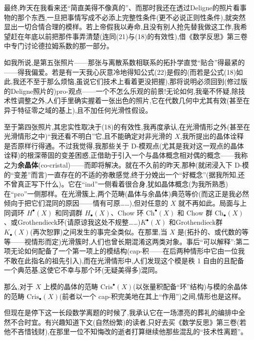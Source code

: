 \noindent 最终,昨天在我看来还“简直美得不像真的”、而那时我还在透过Deligne的照片看事物的那个东西,一旦把事情写成不必添上完整性条件(更不必说正则性条件),就突然显出一切合情合理的模样。若上帝假我以寿命,且没有别人抢先替我做这工作,我希望赶在年底以前把那件事弄清楚(连同(21)与(18)的有效性),借《数学反思》第三卷中专门讨论德拉姆系数的那一部分。

\noindent 如我所说,是第五张照片——那张与离散系数相联系的拓扑学直觉“贴合”得最紧的——得我偏爱。若是有一天我心灰意冷地得知公式(22)是假的(而若是公式(18)如此,我还不至于那么烦恼,虽说它们技术上看着更没把握),那将说明必须回到(修过版的Deligne照片的)pro-观点——一个不怎么乐观的前景!无论如何,我毫不怀疑,除技术性调整之外,人们手里确实握着一张出色的照片,它在代数几何中尤其有效(甚至在异于特征零之域的基上),且不加任何光滑性假设。

\noindent 至于第四张照片,其忠实性取决于(18)的有效性,我再度承认,在光滑情形之外(甚至在光滑情形之中)“我还看不明白”它,且不能确定对非光滑的 $X$,我所提出的晶体诠释是否原样行得通。不过我觉得,我那些关于 D-模观点(尤其是我对这一观点的晶体诠\dmark{}释)的根深蒂固的变差困惑,正借助于引入一个与晶体概念相对偶的概念——我称之为\textbf{余晶体}(co-cristal)——而即将解决。就在不久前的昨天,那种(就闭浸入下 D-模的“变差”而言)一直存在的不适的弥散感觉,终于分娩出一个“好概念”(据我所知,还不曾真正写下什么)。它在“ind”一侧看着很合身,犹如晶体概念(为我所熟悉)在“pro”一侧那样。在光滑簇上,两个范畴(晶体与余晶体)典范等价(而这正是我必然倾向于把它们混同的原因——情有可原……),但对任意的 $X$ 就不再如此。局面与上同调环 $H^{\bullet}(X)$ 和同调群 $H_{\bullet}(X)$、Chow 环 $\mathrm{Ch}^{\bullet}(X)$ 和 Chow 群 $\mathrm{Ch}_{\bullet}(X)$、或Grothendieck环(请原谅我这处不规整……)$K^{\bullet}(X)$ 和Grothendieck群 $K_{\bullet}(X)$(再次恕罪)之间发生的事完全类似。在那里,当 $X$ 是(拓扑的、或代数的等等——视情形而定)光滑簇时,人们也曾长期混淆这两类对象。事后“可以解释”:第二项无论如何配备了一个第一项上的模结构(cap-积——在后两种情形中它由一位我不敢在此指名的祖先引入),而在光滑情形中,人们发现这个模是秩 1 自由的且配备一个典范基,这使它不幸与那个环(无疑美得多)混同。

\noindent 那么,对于 $X$ 上模的晶体的范畴 $\mathrm{Cris}^{\bullet}(X)$(以张量积配备“环”结构)与模的余晶体的范畴 $\mathrm{Cris}_{\bullet}(X)$(前者以一个 cap-积完美地在其上“作用”)之间,情形也是这样。

\noindent 但现在是停下这一长段数学离题的时候了,我承认它在一场漂亮的葬礼的编排中全然不合时宜。有兴趣知道下文(自然纷繁)的读者,只好去买《数学反思》第三卷(若他不吝惜钱财),在那里一位不知悔改的逝者打算继续他那些混乱的“技术性离题”。

